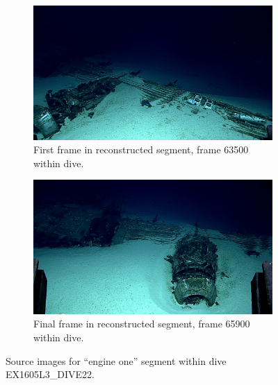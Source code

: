 \documentclass[letterpaper,12pt]{article}
\begin{document}
\begin{figure}
    \centering
    \begin{subfigure}[b]{0.48\textwidth}
        \includegraphics[width=\textwidth]{images/image_063500.png}
        \caption{First frame in reconstructed segment, frame 63500 within dive.}
        \label{fig:ex1605l3_dive22_engine_one_begin}
    \end{subfigure}
    \begin{subfigure}[b]{0.48\textwidth}
        \includegraphics[width=\textwidth]{images/image_065900.png}
        \caption{Final frame in reconstructed segment, frame 65900 within dive.}
        \label{fig:ex1605l3_dive22_engine_one_end}
    \end{subfigure}
    \caption{Source images for ``engine one'' segment within dive EX1605L3\_DIVE22.}
\end{figure}
\end{document}
